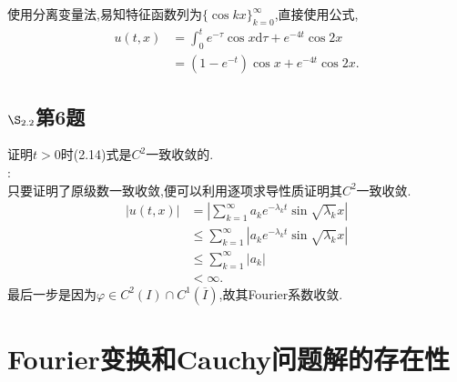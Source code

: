 \documentclass[12pt, a4paper]{ctexbook}
\renewcommand{\d}{\text{d}}
\begin{document}
    使用分离变量法,易知特征函数列为$\{\cos kx\}_{k=0}^{\infty}$,直接使用公式,
    \begin{align*}
    u(t,x) &= \int_0^te^{-\tau} \cos x \d\tau + e^{-4t}\cos2x\\
    &=(1-e^{-t})\cos x + e^{-4t}\cos2x.
    \end{align*}
    
    \subsection{$\S_{2.2}$第6题}
    \kaishu{}证明$t>0$时(2.14)式是$C^2$一致收敛的.\\
    
    \songti{}:\\
    
    只要证明了原级数一致收敛,便可以利用逐项求导性质证明其$C^2$一致收敛.
    \begin{align*}
    |u(t,x)| & =| \sum_{k=1}^{\infty} a_k e^{-\lambda_k t}\sin\sqrt{\lambda_k}x|\\
    &\le \sum_{k=1}^{\infty} |a_k e^{-\lambda_k t}\sin\sqrt{\lambda_k}x|\\
    &\le \sum_{k=1}^{\infty}| a_k |\\
    &< \infty.
    \end{align*}
    最后一步是因为$\varphi \in C^2(I) \cap C^1(\overline{I})$,故其Fourier系数收敛.
    
    \section{Fourier变换和Cauchy问题解的存在性}
\end{document}

